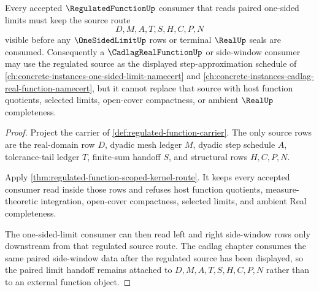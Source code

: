\begin{theorem}
\label{thm:regulated-function-left-right-limit-consumer}
Every accepted $\RegulatedFunctionUp$ consumer that reads paired one-sided limits must keep the source route
$$
D,M,A,T,S,H,C,P,N
$$
visible before any $\OneSidedLimitUp$ rows or terminal $\RealUp$ seals are consumed. Consequently a $\CadlagRealFunctionUp$ or side-window consumer may use the regulated source as the displayed step-approximation schedule of \autoref{ch:concrete-instances-one-sided-limit-namecert} and \autoref{ch:concrete-instances-cadlag-real-function-namecert}, but it cannot replace that source with host function quotients, selected limits, open-cover compactness, or ambient $\RealUp$ completeness.
\end{theorem}
\begin{proof}
Project the carrier of \autoref{def:regulated-function-carrier}. The only source rows are the real-domain row $D$, dyadic mesh ledger $M$, dyadic step schedule $A$, tolerance-tail ledger $T$, finite-sum handoff $S$, and structural rows $H,C,P,N$.

Apply \autoref{thm:regulated-function-scoped-kernel-route}. It keeps every accepted consumer read inside those rows and refuses host function quotients, measure-theoretic integration, open-cover compactness, selected limits, and ambient Real completeness.

The one-sided-limit consumer can then read left and right side-window rows only downstream from that regulated source route. The cadlag chapter consumes the same paired side-window data after the regulated source has been displayed, so the paired limit handoff remains attached to $D,M,A,T,S,H,C,P,N$ rather than to an external function object.
\end{proof}


